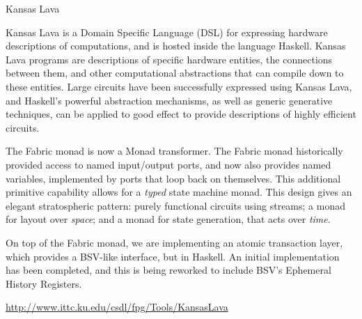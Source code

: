 \begin{hcarentry}{Kansas Lava}
\label{klava}
\makeheader

Kansas Lava is a Domain Specific Language (DSL) for expressing
hardware descriptions of computations, and is hosted inside the
language Haskell. Kansas Lava programs are descriptions of specific hardware
entities, the connections between them, and other computational abstractions
that can compile down to these entities. Large circuits have been successfully
expressed using Kansas Lava, and Haskell's powerful abstraction mechanisms, as
well as generic generative techniques, can be applied to good effect to provide
descriptions of highly efficient circuits.

\begin{compactitem}

\item The Fabric monad is now a Monad transformer.
The Fabric monad historically provided access to named input/output ports,
and now also provides named variables, implemented by ports that loop back on
themselves. This additional primitive capability allows for a {\em typed\/}
state machine monad.
This design gives an elegant stratospheric pattern: purely functional circuits using streams;
a monad for layout over {\em space\/}; and a monad for state generation,
that acts over {\em time\/}.

\item 
On top of the Fabric monad, we are implementing an atomic transaction
layer, which provides a BSV-like interface, but in Haskell. An initial
implementation has been completed, and this is being reworked to include
BSV's Ephemeral History Registers.
\end{compactitem}

\FurtherReading
  \url{http://www.ittc.ku.edu/csdl/fpg/Tools/KansasLava}
\end{hcarentry}
